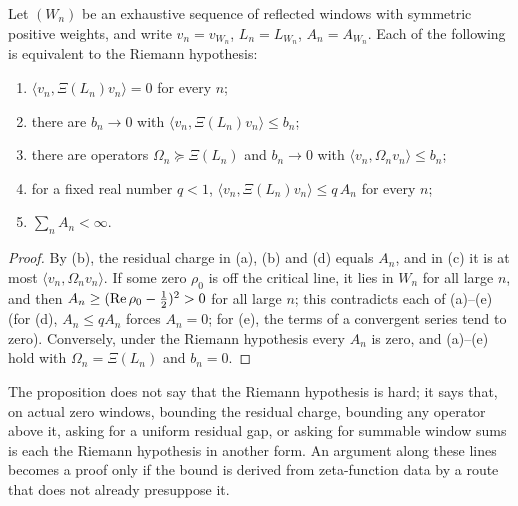 \begin{proposition}
\label{prop:rh:window-equivalences}
Let \((W_n)\) be an exhaustive sequence of reflected windows with
symmetric positive weights, and write \(v_n=v_{W_n}\), \(L_n=L_{W_n}\),
\(A_n=A_{W_n}\).  Each of the following is equivalent to the Riemann
hypothesis:
\begin{enumerate}[label=\textup{(\alph*)}]
  \item \(\langle v_n,\Xi(L_n)v_n\rangle=0\) for every \(n\);
  \item there are \(b_n\to0\) with \(\langle v_n,\Xi(L_n)v_n\rangle\leq b_n\);
  \item there are operators \(\Omega_n\succeq\Xi(L_n)\) and \(b_n\to0\)
    with \(\langle v_n,\Omega_nv_n\rangle\leq b_n\);
  \item for a fixed real number \(q<1\),
    \(\langle v_n,\Xi(L_n)v_n\rangle\leq q\,A_n\) for every \(n\);
  \item \(\sum_n A_n<\infty\).
\end{enumerate}
\end{proposition}

\begin{proof}
By (b), the residual charge in (a),
(b) and (d) equals \(A_n\), and in (c) it is at most
\(\langle v_n,\Omega_nv_n\rangle\).  If some zero \(\rho_0\) is off the
critical line, it lies in \(W_n\) for all large \(n\), and then
\(A_n\geq(\operatorname{Re}\rho_0-\frac12)^2>0\) for all large \(n\); this
contradicts each of (a)--(e) (for (d), \(A_n\leq qA_n\) forces
\(A_n=0\); for (e), the terms of a convergent series tend to zero).
Conversely, under the Riemann hypothesis every \(A_n\) is zero, and
(a)--(e) hold with \(\Omega_n=\Xi(L_n)\) and \(b_n=0\).
\end{proof}

The proposition does not say that the Riemann hypothesis is hard; it
says that, on actual zero windows, bounding the residual charge,
bounding any operator above it, asking for a uniform residual gap, or
asking for summable window sums is each the Riemann hypothesis in
another form.  An argument along these lines becomes a proof only if
the bound is derived from zeta-function data by a route that does not
already presuppose it.
